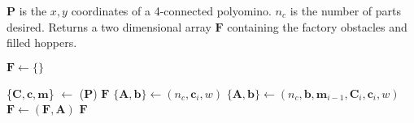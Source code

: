 \begin{algorithm} 
\newcommand\algotext[1]{\end{algorithmic}#1\begin{algorithmic}[1]}
\caption{ ($\mathbf{P}, n_c$)\label{alg:BuildFactory}}
$\mathbf{P}$ is the $x,y$ coordinates of a 4-connected polyomino.  $n_c$ is the number of parts desired. 
Returns a two dimensional array $ \mathbf{F} $ containing the factory obstacles and filled hoppers.
\begin{algorithmic}[1]
\State$\mathbf{F} \leftarrow \{\}$  

\State \{$\mathbf{C},\mathbf{c}, \mathbf{m}$\} $  \leftarrow$ {}($\mathbf{P}$)
 \State \Return  $ \mathbf{F} $
 \EndIf 
 \State$\{ \mathbf{A}, \mathbf{b} \}\leftarrow${}$(n_c, \mathbf{c}_i,w)$
 \State$\{\mathbf{A},\mathbf{b}\}\leftarrow${}$(n_c,\mathbf{b}, \mathbf{m}_{i-1},\mathbf{C}_i, \mathbf{c}_i,w)$
 \State$ \mathbf{F} \leftarrow${}$(\mathbf{F},\mathbf{A})$
\EndFor
\State \Return  $ \mathbf{F} $
\end{algorithmic}
\end{algorithm} 
 
 
 

 
 
